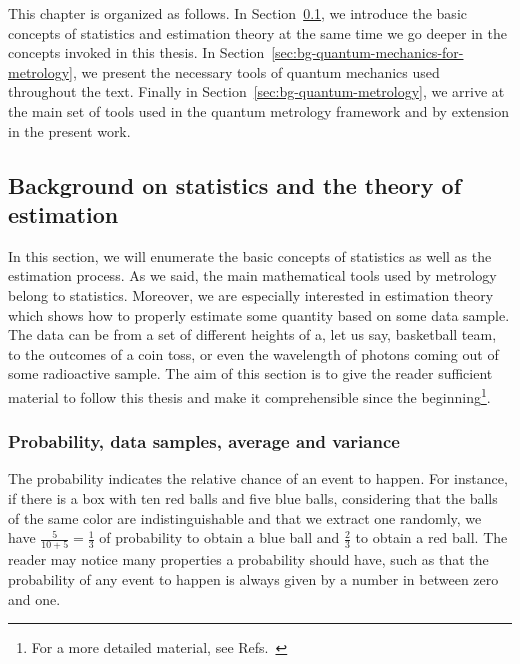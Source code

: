 This chapter is organized as follows.
In Section~\ref{sec:bg-statistics-and-stimation}, we introduce the basic concepts of statistics and estimation theory at the same time we go deeper in the concepts invoked in this thesis.
In Section~\ref{sec:bg-quantum-mechanics-for-metrology}, we present the necessary tools of quantum mechanics used throughout the text.
Finally in Section~\ref{sec:bg-quantum-metrology}, we arrive at the main set of tools used in the quantum metrology framework and by extension in the present work.

\subsection{Background on statistics and the theory of estimation}
\label{sec:bg-statistics-and-stimation}

In this section, we will enumerate the basic concepts of statistics as well as the estimation process.
As we said, the main mathematical tools used by metrology belong to statistics.
Moreover, we are especially interested in estimation theory which shows how to properly estimate some quantity based on some data sample.
The data can be from a set of different heights of a, let us say, basketball team, to the outcomes of a coin toss, or even the wavelength of photons coming out of some radioactive sample.
The aim of this section is to give the reader sufficient material to follow this thesis and make it comprehensible since the beginning\footnote{
For a more detailed material, see Refs.~\citep{Riley2006, Barlow1989}}.

\subsubsection{Probability, data samples, average and variance}

The probability indicates the relative chance of an event to happen.
For instance, if there is a box with ten red balls and five blue balls, considering that the balls of the same color are indistinguishable and that we extract one randomly, we have $\frac{5}{10+5}=\frac{1}{3}$ of probability to obtain a blue ball and $\frac{2}{3}$ to obtain a red ball.
The reader may notice many properties a probability should have, such as that the probability of any event to happen is always given by a number in between zero and one.

